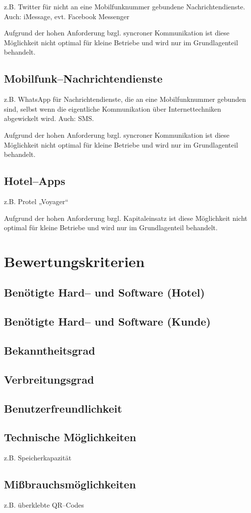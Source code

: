 z.B. Twitter für nicht an eine Mobilfunknummer gebundene Nachrichtendienste. Auch: iMessage, evt. Facebook Messenger

Aufgrund der hohen Anforderung bzgl. syncroner Kommunikation ist diese Möglichkeit nicht optimal für kleine Betriebe und wird nur im Grundlagenteil behandelt.

\subsection{Mobilfunk--Nachrichtendienste}

z.B. WhatsApp für Nachrichtendienste, die an eine Mobilfunknummer gebunden sind, selbst wenn die eigentliche Kommunikation über Internettechniken abgewickelt wird. Auch: SMS.

Aufgrund der hohen Anforderung bzgl. syncroner Kommunikation ist diese Möglichkeit nicht optimal für kleine Betriebe und wird nur im Grundlagenteil behandelt.

\subsection{Hotel--Apps}

z.B. Protel „Voyager“

Aufgrund der hohen Anforderung bzgl. Kapitaleinsatz ist diese Möglichkeit nicht optimal für kleine Betriebe und wird nur im Grundlagenteil behandelt.

\section{Bewertungskriterien}

\subsection{Benötigte Hard-- und Software (Hotel)}
\subsection{Benötigte Hard-- und Software (Kunde)}
\subsection{Bekanntheitsgrad}
\subsection{Verbreitungsgrad}
\subsection{Benutzerfreundlichkeit}
\subsection{Technische Möglichkeiten}

z.B. Speicherkapazität

\subsection{Mißbrauchsmöglichkeiten}

z.B. überklebte QR--Codes